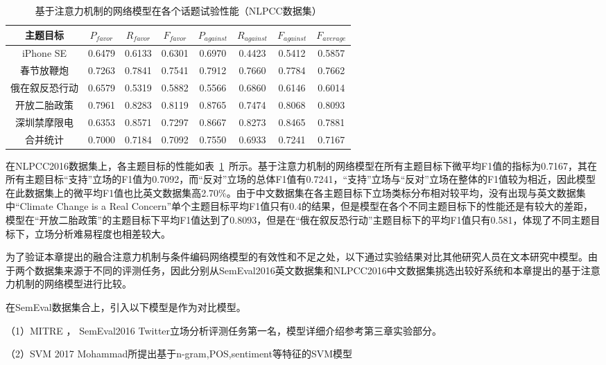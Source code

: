 \begin{table}[htbp]
	\caption[table123]{基于注意力机制的网络模型在各个话题试验性能（NLPCC数据集）}
	\label{chinese_a_bi_gru_cnn_semeval}
	\vspace{0.5em}\centering\wuhao
	\begin{tabular}{cccccccc}
		\toprule[1.5pt]
		主题目标& $P_{favor}$&$R_{favor}$&$F_{favor}$&$P_{against}$&$R_{against}$&$F_{against}$&$F_{average}$ \\
		\midrule[1pt]
		iPhone SE&0.6479&0.6133&0.6301&0.6970&0.4423&0.5412&0.5857\\
		春节放鞭炮&0.7263&0.7841&0.7541&0.7912&0.7660&0.7784&0.7662\\
		俄在叙反恐行动&0.6579&0.5319&0.5882&0.5566&0.6860&0.6146&0.6014\\
		开放二胎政策&0.7961&0.8283&0.8119&0.8765&0.7474&0.8068&0.8093\\
		深圳禁摩限电&0.6353&0.8571&0.7297&0.8667&0.8273&0.8465&0.7881\\
		合并统计&0.7000&0.7184&0.7092&0.7550&0.6933&0.7241&0.7167\\
		\bottomrule[1.5pt]
	\end{tabular}
\end{table}

在NLPCC2016数据集上，各主题目标的性能如表~\ref{chinese_a_bi_gru_cnn_semeval}~所示。基于注意力机制的网络模型在所有主题目标下微平均F1值的指标为0.7167，其在所有主题目标“支持”立场的F1值为0.7092，而“反对”立场的总体F1值有0.7241，“支持”立场与“反对”立场在整体的F1值较为相近，因此模型在此数据集上的微平均F1值也比英文数据集高2.70\%。由于中文数据集在各主题目标下立场类标分布相对较平均，没有出现与英文数据集中“Climate Change is a Real Concern”单个主题目标平均F1值只有0.4的结果，但是模型在各个不同主题目标下的性能还是有较大的差距，模型在“开放二胎政策”的主题目标下平均F1值达到了0.8093，但是在“俄在叙反恐行动”主题目标下的平均F1值只有0.581，体现了不同主题目标下，立场分析难易程度也相差较大。

为了验证本章提出的融合注意力机制与条件编码网络模型的有效性和不足之处，以下通过实验结果对比其他研究人员在文本研究中模型。由于两个数据集来源于不同的评测任务，因此分别从SemEval2016英文数据集和NLPCC2016中文数据集挑选出较好系统和本章提出的基于注意力机制的网络模型进行比较。

在SemEval数据集合上，引入以下模型是作为对比模型。

（1）MITRE ， SemEval2016 Twitter立场分析评测任务第一名，模型详细介绍参考第三章实验部分。

（2）SVM   2017 Mohammad所提出基于n-gram,POS,sentiment等特征的SVM模型

